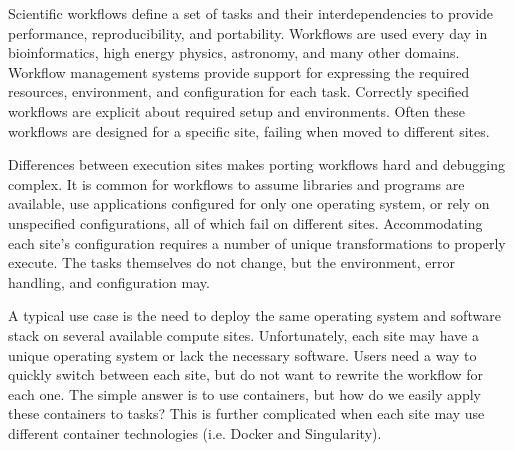 \documentclass[conference]{IEEEtran}
\begin{document}

Scientific workflows define a set of tasks 
and their interdependencies to provide
performance, reproducibility, and portability.
Workflows are used every day in 
bioinformatics\cite{pmid20080505, pmid2231712, makeflow-examples, giardine2005galaxy, blankenberg2010galaxy, goecks2010galaxy}, 
high energy physics\cite{10.1007/978-3-540-24669-5_107, lobster-cluster-2015}, 
astronomy\cite{10.1007/978-3-540-28642-4_2}, 
and many other domains.
Workflow management systems provide support for 
expressing the required resources,
environment, and configuration for each task.
Correctly specified workflows are explicit
about required setup and environments.
Often these workflows are designed for a 
specific site, failing when
moved to different sites.


Differences between execution sites
makes porting workflows hard 
and debugging complex. 
It is common for workflows to
assume libraries and programs are available, 
use  applications configured for only one operating system,
or rely on unspecified configurations,
all of which fail on different sites.
Accommodating each site's configuration
requires a number of unique transformations to properly execute.
The tasks themselves do not change,
but the environment, error handling, and configuration 
may.


A typical use case is the 
need to deploy the same operating system and
software stack on several available
compute sites.
Unfortunately, each site may have a unique
operating system or lack the necessary software.
Users need a way to quickly switch between
each site, but do not want to rewrite the 
workflow for each one.
The simple answer is to use containers,
but how do we easily apply these containers 
to tasks?
This is further complicated when each site
may use different container technologies
(i.e. Docker\cite{Merkel:2014:DLL:2600239.2600241}
and Singularity\cite{Singularity}).
\end{document}
